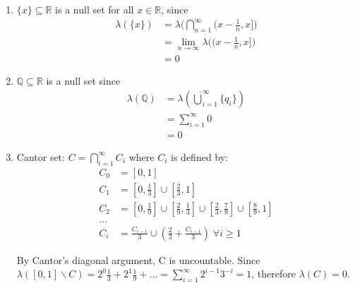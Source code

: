 \documentclass{article}
\begin{document}
	\begin{myex}{}{}
		\begin{enumerate}
			\item $\{x\}\subseteq\mathbb{R}$ is a null set for all $x\in\mathbb{R}$, since
			\begin{align*}
				\lambda(\{x\})&=\lambda\big(\bigcap_{n=1}^{\infty}(x-\frac{1}{n}, x]\big)\\
				&=\lim_{n\to\infty}\lambda\big((x-\frac{1}{n}, x]\big)\\
				&=0
			\end{align*}
			\item $\mathbb{Q}\subseteq\mathbb{R}$ is a null set since
			\begin{align*}
				\lambda(\mathbb{Q})&=\lambda(\dot\bigcup_{i=1}^{\infty}\{q_i\})\\
				&=\sum_{i=1}^{\infty}0\\
				&=0
			\end{align*}
			\item Cantor set: $C=\bigcap_{i=1}^{\infty}C_i$ where $C_i$ is defined by:
			\begin{align*}
				C_0&=[0,1]\\
				C_1&=[0,\frac{1}{3}]\cup[\frac{2}{3}, 1]\\
				C_2&=[0,\frac{1}{9}]\cup[\frac{2}{9}, \frac{1}{3}]\cup[\frac{2}{3}, \frac{7}{9}]\cup[\frac{8}{9}, 1]\\
				\dots\\
				C_i&=\frac{C_{i-1}}{3}\cup(\frac{2}{3}+\frac{C_{i-1}}{3})\;\forall i\geq1
			\end{align*}
			
			By Cantor's diagonal argument, C is uncountable. Since $\lambda([0, 1]\backslash C)=2^0\frac{1}{3}+2^1\frac{1}{9}+\dots=\sum_{i=1}^{\infty}2^{i-1}3^{-i}=1$, therefore $\lambda(C)=0$.
		\end{enumerate}
	\end{myex}
	
\end{document}
